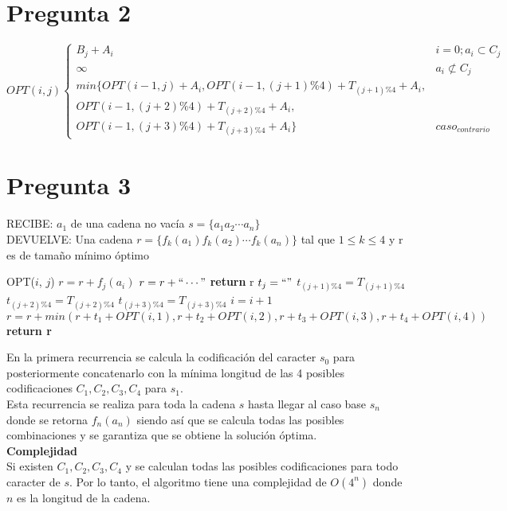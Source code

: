 \documentclass{article}
\begin{document}

    

\section{Pregunta 2}
\[ OPT(i, j) \begin{cases} 
    B_j + A_i & i = 0; a_i \subset C_j \\
    \infty & a_i \not\subset C_j \\
    min\{OPT(i - 1, j) + A_i, OPT(i - 1, (j+1) \%4) + T_{(j+1) \%4} + A_i,\\
    OPT(i - 1, (j+2) \%4) + T_{(j+2) \%4} + A_i, \\ OPT(i - 1, (j+3) \%4) + T_{(j+3) \%4} + A_i\} & {caso}_{contrario} 
 \end{cases}
\]

\section*{Pregunta 3}

\vspace{0.5cm}

\noindent RECIBE: $a_{1}$ de una cadena no vacía $s=\{a_1a_2\cdots a_n\}$ \\
DEVUELVE: Una cadena $r=\{f_k(a_1)f_k(a_2)\cdots f_k(a_n)\}$ tal que $1 \leq k \leq 4$ y r es
de tamaño mínimo óptimo
\begin{algorithmic}[1]
\item[]{OPT($i$, $j$)}
\State $r=r+f_j(a_i)$
\Else 
\State $r=r+``\cdots"$
\EndIf
{}
\State \textbf{return} r
\EndIf
\State $t_j = ``"$
\State $t_{(j+1)\%4} = T_{(j+1)\%4}$
\State $t_{(j+2)\%4} = T_{(j+2)\%4}$
\State $t_{(j+3)\%4} = T_{(j+3)\%4}$
\State $i = i+1$
\State $r=r+min(r+t_1+OPT(i,1),r+t_2+OPT(i,2),
r+t_3+OPT(i,3), r+t_4+OPT(i,4))$
\State \textbf{return r} 
\end{algorithmic}

\vspace{1cm}

En la primera recurrencia se calcula la codificación del caracter $s_0$ para posteriormente concatenarlo
con la mínima longitud de las 4 posibles codificaciones $C_1,C_2,C_3,C_4$ para $s_1$.\\
Esta recurrencia se realiza para toda la cadena $s$ hasta llegar al caso base $s_n$ donde se retorna $f_n(a_n)$
siendo así que se calcula todas las posibles combinaciones y se garantiza que se obtiene la solución óptima.\\

\textbf{Complejidad}\\
Si existen $C_1,C_2,C_3,C_4$ y se calculan todas las posibles codificaciones para todo caracter de $s$.
Por lo tanto, el algoritmo tiene una complejidad de $O(4^n)$ donde $n$ es la longitud de la cadena.
\end{document}
